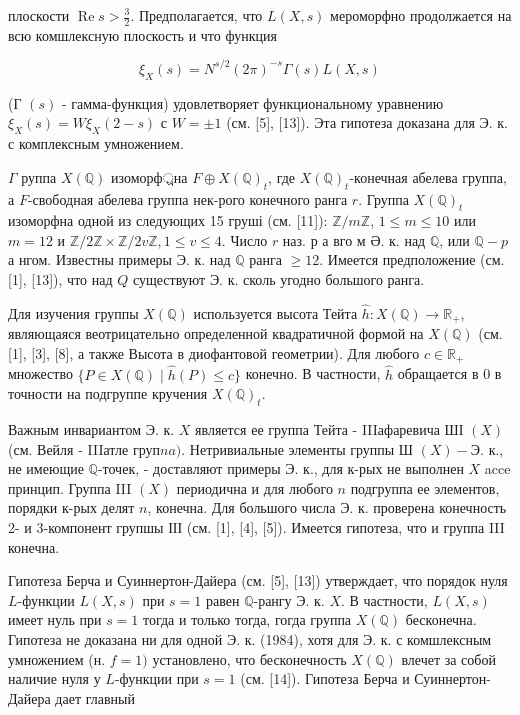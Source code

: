 \documentclass[10pt]{article}
\begin{document}
плоскости $\operatorname{Re} s>\frac{3}{2}$. Предполагается, что $L(X, s)$ мероморфно продолжается на всю комшлексную плоскость и что функция



\[

\xi_{X}(s)=N^{s / 2}(2 \pi)^{-s} \Gamma(s) L(X, s)

\]



(Г $(s)$ - гамма-функция) удовлетворяет функциональному уравнению $\xi_{X}(s)=W \xi_{X}(2-s)$ с $W= \pm 1$ (см. [5], [13]). Эта гипотеза доказана для Э. к. с комплексным умножением.



$\Gamma$ руппа $X(\mathbb{Q})$ изоморф্রна $F \oplus X(\mathbb{Q})_{t}$, где $X(\mathbb{Q})_{t}$-конечная абелева группа, а $F$-свободная абелева группа нек-рого конечного ранга $r$. Группа $X(\mathbb{Q})_{t}$ изоморфна одной из следующих 15 груші (см. [11]): $\mathbb{Z} / m \mathbb{Z}$, $1 \leqslant m \leqslant 10$ или $m=12$ и $\mathbb{Z} / 2 \mathbb{Z} \times \mathbb{Z} / 2 v \mathbb{Z}, 1 \leqslant v \leqslant 4$. Число $r$ наз. р а вго м Ә. к. над $\mathbb{Q}$, или $\mathbb{Q}-p$ а нгом. Известны примеры Э. к. над $\mathbb{Q}$ ранга $\geqslant 12$. Имеется предположение (см. [1], [13]), что над $Q$ существуют Э. к. сколь угодно большого ранга.



Для изучения группы $X(\mathbb{Q})$ используется высота Тейта $\hat{h}: X(\mathbb{Q}) \longrightarrow \mathbb{R}_{+}$, являющаяся веотрицательно определенной квадратичной формой на $X(\mathbb{Q})$ (см. [1], [3], [8], а также Высота в диофантовой геометрии). Для любого $c \in \mathbb{R}_{+}$множество $\{P \in X(\mathbb{Q}) \mid \hat{h}(P) \leqslant c\}$ конечно. В частности, $\hat{h}$ обращается в 0 в точности на подгруппе кручения $X(\mathbb{Q})_{t}$.



Важным инвариантом Э. к. $X$ является ее группа Тейта - IIIафаревича ШІ $(X)$ (см. Вейля - IIIатле груп$n a)$. Нетривиальные элементы группы Ш $(X)-Э$. к., не имеющие $\mathbb{Q}$-точек, - доставляют примеры Э. к., для к-рых не выполнен $X$ acce принцип. Группа III $(X)$ периодична и для любого $n$ подгруппа ее элементов, порядки к-рых делят $n$, конечна. Для большого числа Э. к. проверена конечность 2- и 3-компонент групшы ІІІ (см. [1], [4], [5]). Имеется гипотеза, что и группа III конечна.



Гипотеза Берча и Суиннертон-Дайера (см. [5], [13]) утверждает, что порядок нуля $L$-функции $L(X, s)$ при $s=1$ равен $\mathbb{Q}$-рангу Э. к. $X$. В частности, $L(X, s)$ имеет нуль при $s=1$ тогда и только тогда, гогда группа $X(\mathbb{Q})$ бесконечна. Гипотеза не доказана ни для одной Э. к. (1984), хотя для Э. к. с комшлексным умножением (н. $f=1)$ установлено, что бесконечность $X(\mathbb{Q})$ влечет за собой наличие нуля у $L$-функции при $s=1$ (см. [14]). Гипотеза Берча и Суиннертон-Дайера дает главный
\end{document}
